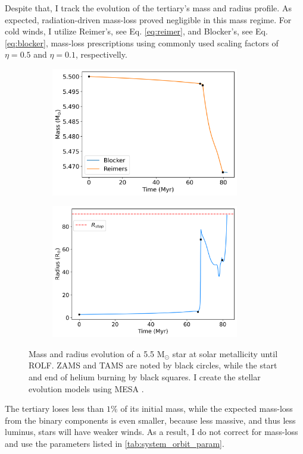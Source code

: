 Despite that, I track the evolution of the tertiary's mass and radius profile. As expected, radiation-driven mass-loss proved negligible in this mass regime. For cold winds, I utilize Reimer's, see Eq. \eqref{eq:reimer}, and Blocker's, see Eq. \eqref{eq:blocker}, mass-loss prescriptions using commonly used scaling factors of $\eta = 0.5$ and $\eta = 0.1$, respectivelly. 
\begin{figure}[H]
    \centering
    \begin{subfigure}{.5\textwidth}
    \centering
    \includegraphics[width=0.9\textwidth]{Thesis/graphs/giant_1-1mass_loss.pdf}
    \label{fig:mass_loss}
    \end{subfigure}%
    \begin{subfigure}{.5\textwidth}
    \centering
    \includegraphics[width=0.9\textwidth]{Thesis/graphs/giant_1-1radius.pdf}
    \label{fig:radius_profile}
    \end{subfigure}
    \caption{ Mass and radius evolution of a 5.5 M$_{\odot}$ star at solar metallicity until ROLF. ZAMS and TAMS are noted by black circles, while the start and end of helium burning by black squares. I create the stellar evolution models using MESA \citep{paxton2010modules,paxton2013modules,paxton2015modules,paxton2019modules}.}
\end{figure}
The tertiary loses less than $1\%$ of its 
initial mass, while the expected mass-loss from the binary components is even smaller, because less massive, and thus less luminus, stars will have weaker winds. As a result, I do not correct for mass-loss and use the parameters listed in  \cref{tab:system_orbit_param}.

